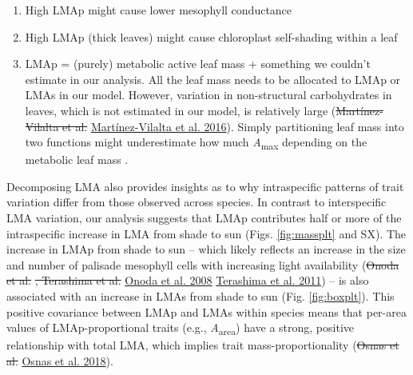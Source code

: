 \documentclass[
  12pt,
]{article}
\providecommand{\tightlist}{%
  \setlength{\itemsep}{0pt}\setlength{\parskip}{0pt}}
\providecommand{\DIFaddtex}[1]{{\protect\color{blue}\uwave{#1}}} %
\providecommand{\DIFdeltex}[1]{{\protect\color{red}\sout{#1}}}                      %
\providecommand{\DIFaddbegin}{} %
\providecommand{\DIFaddend}{} %
\providecommand{\DIFdelbegin}{} %
\providecommand{\DIFdelend}{} %
\providecommand{\DIFadd}[1]{\texorpdfstring{\DIFaddtex{#1}}{#1}} %
\providecommand{\DIFdel}[1]{\texorpdfstring{\DIFdeltex{#1}}{}} %
\newcommand{\DIFscaledelfig}{0.5}
\newlength{\DIFdelgraphicswidth} %
\newlength{\DIFdelgraphicsheight} %
\newcommand{\DIFaddincludegraphics}[2][]{{\color{blue}\fbox{\DIFOincludegraphics[#1]{#2}}}} %
\newcommand{\DIFdelincludegraphics}[2][]{%
\sbox{\DIFdelgraphicsbox}{\DIFOincludegraphics[#1]{#2}}%
\settoboxwidth{\DIFdelgraphicswidth}{\DIFdelgraphicsbox} %
\settoboxtotalheight{\DIFdelgraphicsheight}{\DIFdelgraphicsbox} %
\scalebox{\DIFscaledelfig}{%
\parbox[b]{\DIFdelgraphicswidth}{\usebox{\DIFdelgraphicsbox}\\[-\baselineskip] \rule{\DIFdelgraphicswidth}{0em}}\llap{\resizebox{\DIFdelgraphicswidth}{\DIFdelgraphicsheight}{%
\setlength{\unitlength}{\DIFdelgraphicswidth}%
\begin{picture}(1,1)%
\thicklines\linethickness{2pt} %
{\color[rgb]{1,0,0}\put(0,0){\framebox(1,1){}}}%
{\color[rgb]{1,0,0}\put(0,0){\line( 1,1){1}}}%
{\color[rgb]{1,0,0}\put(0,1){\line(1,-1){1}}}%
\end{picture}%
}\hspace*{3pt}}} %
} %
\DeclareRobustCommand{\DIFaddbegin}{\DIFOaddbegin \let\includegraphics\DIFaddincludegraphics} %
\DeclareRobustCommand{\DIFaddend}{\DIFOaddend \let\includegraphics\DIFOincludegraphics} %
\DeclareRobustCommand{\DIFdelbegin}{\DIFOdelbegin \let\includegraphics\DIFdelincludegraphics} %
\DeclareRobustCommand{\DIFdelend}{\DIFOaddend \let\includegraphics\DIFOincludegraphics} %
\begin{document}
\begin{enumerate}
\def\labelenumi{\arabic{enumi}.}
\tightlist
\item
  High LMAp might cause lower mesophyll conductance
\item
  High LMAp (thick leaves) might cause chloroplast self-shading within a leaf
\item
  LMAp = (purely) metabolic active leaf mass + something we couldn't estimate in our analysis. All the leaf mass needs to be allocated to LMAp or LMAs in our model. However, variation in non-structural carbohydrates in leaves, which is not estimated in our model, is relatively large (\DIFdelbegin \DIFdel{Martínez-Vilalta et al. }\DIFdelend \protect\DIFdelbegin %
\DIFdelend \DIFaddbegin \hyperlink{ref-Martinez-Vilalta2016}{Martínez-Vilalta et al. 2016}\DIFaddend ). Simply partitioning leaf mass into two functions might underestimate how much \emph{A}\textsubscript{max} depending on the metabolic leaf mass .
\end{enumerate}

Decomposing LMA also provides insights as to why intraspecific patterns of trait variation differ from those observed across species.
In contrast to interspecific LMA variation, our analysis suggests that LMAp contributes half or more of the intraspecific increase in LMA from shade to sun (Figs. \DIFaddbegin \DIFadd{Fig.~}\DIFaddend \ref{fig:massplt} and SX).
The increase in LMAp from shade to sun -- which likely reflects an increase in the size and number of palisade mesophyll cells with increasing light availability (\DIFdelbegin \DIFdel{Onoda et al. }\DIFdelend \protect\DIFdelbegin %
\DIFdel{, Terashima et al. }\DIFdelend \DIFaddbegin \hyperlink{ref-Onoda2008}{Onoda et al. 2008}\DIFadd{, }\DIFaddend \protect\DIFdelbegin %
\DIFdelend \DIFaddbegin \hyperlink{ref-Terashima2011}{Terashima et al. 2011}\DIFaddend ) -- is also associated with an increase in LMAs from shade to sun (Fig. \DIFaddbegin \DIFadd{Fig.~}\DIFaddend \ref{fig:boxplt}).
This positive covariance between LMAp and LMAs within species means that per-area values of LMAp-proportional traits (e.g., \emph{A}\textsubscript{area}) have a strong, positive relationship with total LMA, which implies trait mass-proportionality (\DIFdelbegin \DIFdel{Osnas et al. }\DIFdelend \protect\DIFdelbegin %
\DIFdelend \DIFaddbegin \hyperlink{ref-Osnas2018}{Osnas et al. 2018}\DIFaddend ).
\end{document}
